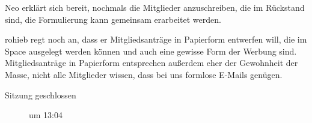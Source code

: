\documentclass[a4paper,12pt]{scrartcl}
\begin{document}
Neo erklärt sich bereit, nochmals die Mitglieder anzuschreiben, die im Rückstand
sind, die Formulierung kann gemeinsam erarbeitet werden.

rohieb regt noch an, dass er Mitgliedsanträge in Papierform entwerfen will, die
im Space ausgelegt werden können und auch eine gewisse Form der Werbung sind.
Mitgliedsanträge in Papierform entsprechen außerdem eher der Gewohnheit der
Masse, nicht alle Mitglieder wissen, dass bei uns formlose E-Mails genügen.

\begin{description}
	\item[Sitzung geschlossen] um 13:04
\end{description}
\end{document}
